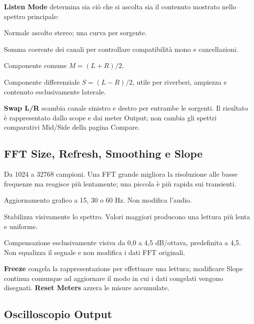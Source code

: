 \documentclass[11pt,a4paper]{article}
\newcommand{\control}[1]{\textbf{\textsf{#1}}}
\begin{document}
\control{Listen Mode} determina sia ciò che si ascolta sia il contenuto mostrato
nello spettro principale:

\begin{description}[style=nextline]
  \item[\control{Stereo}] Normale ascolto stereo; una curva per sorgente.
  \item[\control{Mono}] Somma coerente dei canali per controllare compatibilità
  mono e cancellazioni.
  \item[\control{Mid}] Componente comune \(M=(L+R)/2\).
  \item[\control{Side}] Componente differenziale \(S=(L-R)/2\), utile per
  riverberi, ampiezza e contenuto esclusivamente laterale.
\end{description}

\control{Swap L/R} scambia canale sinistro e destro per entrambe le sorgenti.
Il risultato è rappresentato dallo scope e dai meter Output; non cambia gli
spettri comparativi Mid/Side della pagina Compare.

\subsection{FFT Size, Refresh, Smoothing e Slope}

\begin{description}[style=nextline]
  \item[\control{FFT Size}] Da 1024 a 32768 campioni. Una FFT grande migliora
  la risoluzione alle basse frequenze ma reagisce più lentamente; una piccola
  è più rapida sui transienti.
  \item[\control{Refresh}] Aggiornamento grafico a 15, 30 o 60 Hz. Non modifica
  l'audio.
  \item[\control{Smoothing}] Stabilizza visivamente lo spettro. Valori maggiori
  producono una lettura più lenta e uniforme.
  \item[\control{Slope}] Compensazione esclusivamente visiva da 0,0 a
  4,5 dB/ottava, predefinita a 4,5. Non equalizza il segnale e non modifica i
  dati FFT originali.
\end{description}

\control{Freeze} congela la rappresentazione per effettuare una lettura;
modificare Slope continua comunque ad aggiornare il modo in cui i dati
congelati vengono disegnati. \control{Reset Meters} azzera le misure accumulate.

\subsection{Oscilloscopio Output}
\end{document}
